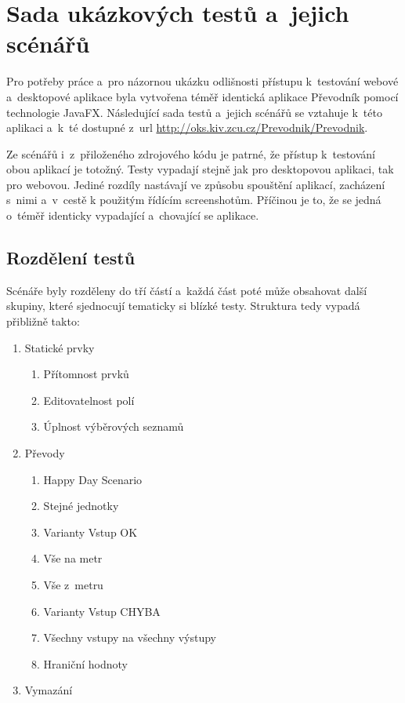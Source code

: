 \chapter{Sada ukázkových testů a~jejich scénářů}
Pro potřeby práce a~pro názornou ukázku odlišnosti přístupu k~testování webové a~desktopové aplikace byla vytvořena téměř identická aplikace Převodník pomocí technologie JavaFX. Následující sada testů a~jejich scénářů se vztahuje k~této aplikaci a~k~té dostupné z~url \url{http://oks.kiv.zcu.cz/Prevodnik/Prevodnik}.

Ze scénářů i~z~přiloženého zdrojového kódu je patrné, že přístup k~testování obou aplikací je totožný. Testy vypadají stejně jak pro desktopovou aplikaci, tak pro webovou. Jediné rozdíly nastávají ve způsobu spouštění aplikací, zacházení s~nimi a~v~cestě k použitým řídícím screenshotům. Příčinou je to, že se jedná o~téměř identicky vypadající a~chovající se aplikace.

	\section{Rozdělení testů}
	Scénáře byly rozděleny do tří částí a~každá část poté může obsahovat další skupiny, které sjednocují tematicky si blízké testy. Struktura tedy vypadá přibližně takto:
		{\renewcommand{\labelenumii}{\theenumii}
		\renewcommand{\theenumii}{\theenumi.\arabic{enumii}.}
		\begin{enumerate}
		\item Statické prvky
			\begin{enumerate}
			\item Přítomnost prvků
			\item Editovatelnost polí
			\item Úplnost výběrových seznamů
			\end{enumerate}
		\item Převody
			\begin{enumerate}
			\item Happy Day Scenario
			\item Stejné jednotky
			\item Varianty Vstup OK
			\item Vše na metr
			\item Vše z~metru
			\item Varianty Vstup CHYBA
			\item Všechny vstupy na všechny výstupy
			\item Hraniční hodnoty
			\end{enumerate}
		\item Vymazání
		\end{enumerate}}
		
